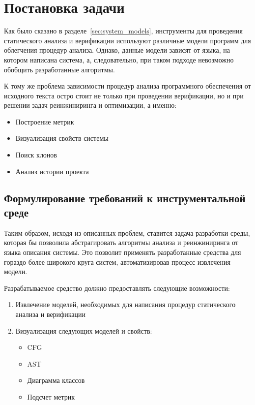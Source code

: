 \chapter{Постановка задачи}
\label{sec:task}
Как было сказано в разделе~\ref{sec:system_models}, инструменты для проведения
статического анализа и верификации используют различные модели программ для
облегчения процедур анализа. Однако, данные модели зависят от языка, на котором
написана система, а, следовательно, при таком подходе невозможно обобщить
разработанные алгоритмы.

К тому же проблема зависимости процедур анализа программного обеспечения от
исходного текста остро стоит не только при проведении верификации, но и при
решении задач реинжиниринга и оптимизации, а именно:

\begin{itemize}
    \item Построение метрик
    \item Визуализация свойств системы
    \item Поиск клонов
    \item Анализ истории проекта
\end{itemize}

\section{Формулирование требований к инструментальной среде}


Таким образом, исходя из описанных проблем, ставится задача разработки среды,
которая бы позволила абстрагировать алгоритмы анализа и реинжиниринга от языка
описания системы. Это позволит применять разработанные средства для гораздо
более широкого круга систем, автоматизировав процесс извлечения модели.

Разрабатываемое средство должно предоставлять следующие возможности:

\begin{enumerate}
    \item Извлечение моделей, необходимых для написания процедур статического
    анализа и верификации
    \item Визуализация следующих моделей и свойств:
        \begin{itemize}
            \item CFG
            \item AST
            \item Диаграмма классов
            \item Подсчет метрик
        \end{itemize}
\end{enumerate}

